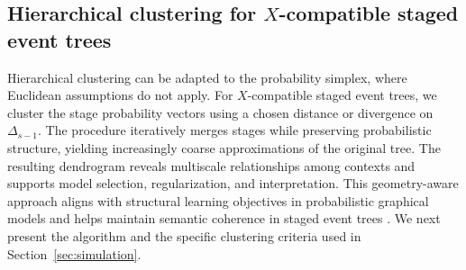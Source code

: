 \documentclass[preprint,12pt]{elsarticle}
\begin{document}




\subsection{Hierarchical clustering for $X$-compatible staged event trees}
\label{sec:sevtHC}

Hierarchical clustering can be adapted to the probability simplex, where Euclidean assumptions do not apply. For \(X\)-compatible staged event trees, we cluster the stage probability vectors using a chosen distance or divergence on \(\Delta_{s-1}\). The procedure iteratively merges stages while preserving probabilistic structure, yielding increasingly coarse approximations of the original tree. The resulting dendrogram reveals multiscale relationships among contexts and supports model selection, regularization, and interpretation. This geometry-aware approach aligns with structural learning objectives in probabilistic graphical models and helps maintain semantic coherence in staged event trees \citep{JSSv102i06,amari2000methods,pistone2024unified}. We next present the algorithm and the specific clustering criteria used in Section~\ref{sec:simulation}.


\end{document}
